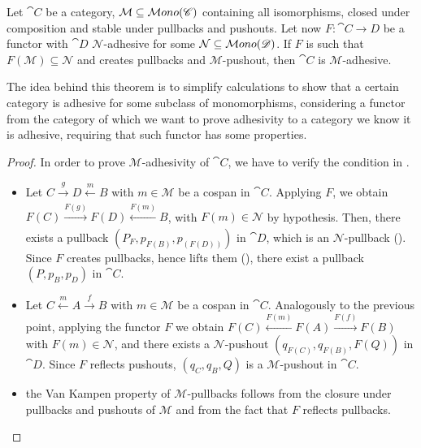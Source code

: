 \begin{theorem}\label{th:crit_for_adh}
    Let $\cat C$ be a category, $\mathcal M \subseteq \mathcal{M}ono(\mathscr{C})$ containing all isomorphisms, closed under composition and stable under pullbacks and pushouts. Let now $F: \cat{C \rightarrow D}$ be a functor with $\cat D$ $\mathcal{N}$-adhesive for some $\mathcal{N} \subseteq \mathcal{M}ono(\mathscr{D})$.
    If $F$ is such that $F(\mathcal{M}) \subseteq \mathcal N$ and creates pullbacks and $\mathcal{M}$-pushout, then $\cat C$ is $\mathcal M$-adhesive.
\end{theorem}

The idea behind this theorem is to simplify calculations to show that a certain category is adhesive for some subclass of monomorphisms, considering a functor from the category of which we want to prove adhesivity to a category we know it is adhesive, requiring that such functor has some properties.

\begin{proof}
    In order to prove $\mathcal M$-adhesivity of $\cat C$, we have to verify the condition in .
    \begin{itemize}
        \item Let $C \xrightarrow[]{g} D \xleftarrow[]{m} B$ with $m \in \mathcal M$ be a cospan in $\cat C$. Applying $F$, we obtain $F(C) \xrightarrow[]{F(g)} F(D) \xleftarrow[]{F(m)} B$, with $F(m) \in \mathcal{N}$ by hypothesis. Then, there exists a pullback $(P_F, p_{F(B)}, p_{(F(D))})$ in $\cat D$, which is an $\mathcal N$-pullback (). Since $F$ creates pullbacks, hence lifts them (), there exist a pullback $(P, p_B, p_D)$ in $\cat C$.
        \item Let $C \xleftarrow{m} A \xrightarrow{f} B$ with $ m \in \mathcal M$ be a cospan in $\cat C$. Analogously to the previous point, applying the functor $F$ we obtain $F(C) \xleftarrow{F(m)} F(A) \xrightarrow{F(f)} F(B)$ with $ F(m) \in \mathcal N$, and there exists a $\mathcal N$-pushout $(q_{F(C)}, q_{F(B)}, F(Q))$ in $\cat D$. Since $F$ reflects pushouts, $(q_C, q_B, Q)$ is a $\mathcal{M}$-pushout in $\cat C$.
        \item the Van Kampen property of $\mathcal M$-pullbacks follows from the closure under pullbacks and pushouts of $\mathcal M$ and from the fact that $F$ reflects pullbacks.
    \end{itemize}
    
\end{proof}


